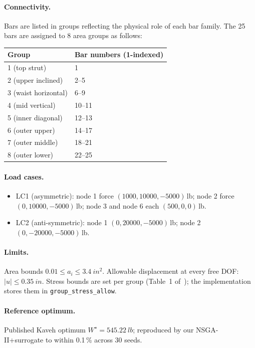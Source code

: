 \paragraph{Connectivity.} Bars are listed in groups reflecting
the physical role of each bar family. The 25 bars are assigned
to 8 area groups as follows:
\begin{center}
\small
\begin{tabular}{ll}
  \toprule
  Group & Bar numbers (1-indexed) \\
  \midrule
  1 (top strut)           & 1 \\
  2 (upper inclined)      & 2--5 \\
  3 (waist horizontal)    & 6--9 \\
  4 (mid vertical)        & 10--11 \\
  5 (inner diagonal)      & 12--13 \\
  6 (outer upper)         & 14--17 \\
  7 (outer middle)        & 18--21 \\
  8 (outer lower)         & 22--25 \\
  \bottomrule
\end{tabular}
\end{center}

\paragraph{Load cases.}
\begin{itemize}
  \item LC1 (asymmetric): node 1 force
    $(1000,10000,-5000)$\,lb;
    node 2 force $(0,10000,-5000)$\,lb; node 3 and node 6
    each $(500,0,0)$\,lb.
  \item LC2 (anti-symmetric): node 1 $(0,20000,-5000)$\,lb;
    node 2 $(0,-20000,-5000)$\,lb.
\end{itemize}

\paragraph{Limits.} Area bounds $\num{0.01}\le a_i\le\SI{3.4}{in^2}$.
Allowable displacement at every free DOF:
$|u|\le\SI{0.35}{in}$. Stress bounds are set per group (Table~1
of~\cite{kaveh2010}); the implementation stores them in
\texttt{group\_stress\_allow}.

\paragraph{Reference optimum.} Published Kaveh optimum
$W^\star=\SI{545.22}{lb}$; reproduced by our NSGA-II+surrogate to
within \num{0.1}\,\% across 30 seeds.

